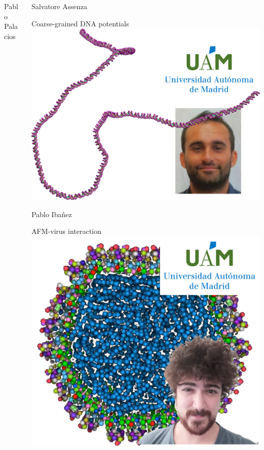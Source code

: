 \documentclass[xcolor=dvipsnames, compress]{beamer}
\begin{document}
\begin{frame}
\begin{columns}[T]
\begin{column}{0.32\linewidth}
\begin{block}{Pablo Palacios}
\begin{center}
        \end{center}
      \end{block}
    \end{column}
    \begin{column}{0.32\linewidth}
      \begin{block}{Salvatore Assenza}
        \begin{center}
          \scriptsize Coarse-grained DNA potentials\newline
          \includegraphics[height=0.3\paperheight]{salvatore}
        \end{center}
      \end{block}
      \vspace*{-7pt}
      \begin{block}{Pablo Ibañez}
        \begin{center}
          \scriptsize AFM-virus interaction\newline
          \includegraphics[height=0.3\paperheight]{pabloibanez}

\end{center}
\end{block}
\end{column}
\end{columns}
\end{frame}
\end{document}
